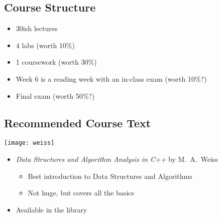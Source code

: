 
\begin{slide}
\section{Course Structure}

\begin{PauseHighLight}
  \begin{itemize}
  \item 30ish lectures\pause
  \item 4 labs (worth 10\%)\pauseb
  \item 1 coursework (worth 30\%)\pauseb
  \item Week 6 is a reading week with an in-class exam (worth 10\%?)\pauseb
  \item Final exam (worth 50\%?)\pauseb
  \end{itemize}
\end{PauseHighLight}


\end{slide}




\begin{slide}
\section{Recommended Course Text}

\begin{minipage}{10cm}
\texttt{[image: weiss]}
\end{minipage}\hfill
\begin{minipage}{12cm}
  \begin{PauseHighLight}
    \begin{itemize}
    \item \textit{Data Structures and Algorithm Analysis in C++} by
      M.~A.~Weiss\pause
      \begin{itemize}
      \item Best introduction to Data Structures and Algorithms\pause
      \item Not huge, but covers all the basics\pause
      \end{itemize}
    \item Available in the library\pause
    \end{itemize}
  \end{PauseHighLight}
\end{minipage}

\end{slide}


